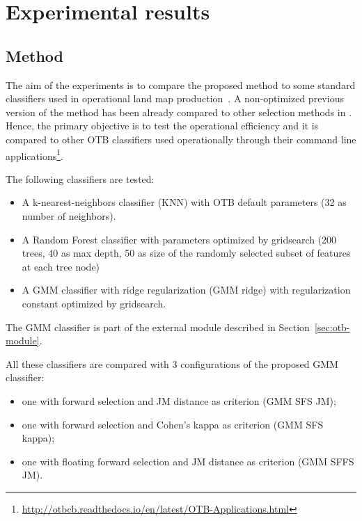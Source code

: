 \documentclass[journal,peerreview,onecolumn]{IEEEtran}
\begin{document}
\section{Experimental results}
\label{sec:test}

    \subsection{Method}
    \label{sec:method}

    The aim  of the experiments is  to compare the proposed  method to
    some   standard  classifiers   used   in   operational  land   map
    production~\cite{rs70912356}. A non-optimized  previous version of
    the method has been already compared to other selection methods in
    \cite{fauvel2015fast}.  Hence,  the primary  objective is  to test
    the  operational  efficiency  and  it is  compared  to  other  OTB
    classifiers   used  operationally   through  their   command  line
    applications\footnote{\url{http://otbcb.readthedocs.io/en/latest/OTB-Applications.html}}.

    The following classifiers are tested:
    \begin{itemize}
        \item A k-nearest-neighbors classifier (KNN) with OTB default parameters (32 as number of neighbors).
        \item A Random Forest classifier with parameters optimized by gridsearch (200 trees, 40 as max depth, 50 as size of the randomly selected subset of features at each tree node)
        \item A GMM classifier with ridge regularization (GMM ridge) with regularization constant optimized by gridsearch.
    \end{itemize}
    The GMM classifier is part of the external module described in Section~\ref{sec:otb-module}.

    All these classifiers are compared with 3 configurations of the proposed GMM classifier:
    \begin{itemize}
        \item one with forward selection and JM distance as criterion (GMM SFS JM);
        \item one with forward selection and Cohen's kappa as criterion (GMM SFS kappa);
        \item one with floating forward selection and JM distance as criterion (GMM SFFS JM).
    \end{itemize}
\end{document}

